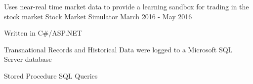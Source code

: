 \begin{cventries}
  \cventry
    {Uses near-real time market data to provide a learning sandbox for trading in the stock market} %
    {Stock Market Simulator} %
    {} %
    {March 2016 - May 2016} %
    {
      \begin{cvitems} %
        \item {Written in C\#/ASP.NET}
        \item {Transnational Records and Historical Data were logged to a Microsoft SQL Server database}
        \item {Stored Procedure SQL Queries}
      \end{cvitems}
    }

\end{cventries}
